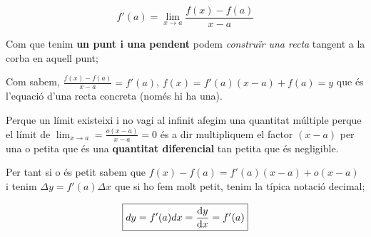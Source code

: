 \documentclass[12pt]{article}
\begin{document}
\[\boxed{f'(a) =\lim_{x\rightarrow a}\frac{f(x) - f(a)}{x-a}}\]

Com que tenim \textbf{un punt i una pendent} podem \textit{construïr una recta} tangent a la corba en aquell punt;

\begin{center}
\end{center}

Com sabem, $\frac{f(x) - f(a)}{x-a} = f'(a)$, $f(x) = f'(a) (x-a) + f(a) = y$ que és l'equació d'una recta concreta (només hi ha una).

Perque un límit existeixi i no vagi al infinit afegim una quantitat múltiple perque el límit de $\lim_{x\rightarrow a} = \frac{o (x-a)}{x-a} = 0$ és a dir multipliquem el factor $(x-a)$ per una o petita que és una \textbf{quantitat diferencial} tan petita que és negligible.

Per tant si o és petit sabem que $f(x) - f(a) = f'(a) (x-a) + o(x-a)$ i tenim $\Delta y = f'(a) \Delta x$ que si ho fem molt petit, tenim la típica notació decimal;

\[\boxed{dy = f'(a) dx = \dv{y}{x} = f'(a)}\]
\end{document}
